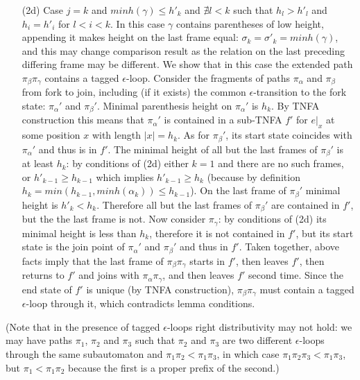 \documentclass[AMA,STIX1COL]{WileyNJD-v2}
\begin{document}
\begin{proofEnd}
\begin{itemize}[itemsep=0.2em, topsep=0.5em]
\begin{itemize}
        \item[(2d)]
            Case $j = k$ and $minh (\gamma) \leq h'_k$
            and $\nexists l < k$ such that $h_l > h'_l$ and $h_i = h'_i$ for $l < i < k$.
            In this case $\gamma$ contains parentheses of low height,
            appending it makes height on the last frame equal:
            $\sigma_k = \sigma'_k = minh (\gamma)$,
            and this may change comparison result
            as the relation on the last preceding differing frame may be different.
            We show that in this case the extended path $\pi_\beta \pi_\gamma$ contains a tagged $\epsilon$-loop.
            Consider the fragments of paths $\pi_\alpha$ and $\pi_\beta$ from fork to join,
            including (if it exists) the common $\epsilon$-transition to the fork state:
            $\pi_\alpha'$ and $\pi_\beta'$.
            Minimal parenthesis height on $\pi_\alpha'$ is $h_k$.
            By TNFA construction this means that $\pi_\alpha'$ is contained
            in a sub-TNFA $f'$ for $e|_x$ at some position $x$ with length $|x| = h_k$.
            As for $\pi_\beta'$, its start state coincides with $\pi_\alpha'$ and thus is in $f'$.
            The minimal height of all but the last frames of $\pi_\beta'$ is at least $h_k$:
            by conditions of (2d) either $k = 1$ and there are no such frames,
            or $h'_{k-1} \geq h_{k-1}$ which implies $h'_{k-1} \geq h_k$
            (because by definition $h_k = min(h_{k-1}, minh(\alpha_k)) \leq h_{k-1}$).
            On the last frame of $\pi_\beta'$ minimal height is $h'_k < h_k$.
            Therefore all but the last frames of $\pi_\beta'$ are contained in $f'$,
            but the the last frame is not.
            Now consider $\pi_\gamma$: by conditions of (2d) its minimal height is less than $h_k$,
            therefore it is not contained in $f'$,
            but its start state is the join point of $\pi_\alpha'$ and $\pi_\beta'$ and thus in $f'$.
            Taken together, above facts imply that the last frame of $\pi_\beta \pi_\gamma$
            starts in $f'$, then leaves $f'$, then returns to $f'$ and joins with $\pi_\alpha \pi_\gamma$,
            and then leaves $f'$ second time.
            Since the end state of $f'$ is unique (by TNFA construction),
            $\pi_\beta \pi_\gamma$ must contain a tagged $\epsilon$-loop through it,
            which contradicts lemma conditions.
        \end{itemize}
    \end{itemize}
    (Note that in the presence of tagged $\epsilon$-loops right distributivity may not hold:
    we may have paths $\pi_1$, $\pi_2$ and $\pi_3$
    such that $\pi_2$ and $\pi_3$ are two different $\epsilon$-loops through the same subautomaton
    and $\pi_1 \pi_2 < \pi_1 \pi_3$,
    in which case $\pi_1 \pi_2 \pi_3 < \pi_1 \pi_3$,
    but $\pi_1 < \pi_1 \pi_2$ because the first is a proper prefix of the second.)
\end{proofEnd}
\end{document}
